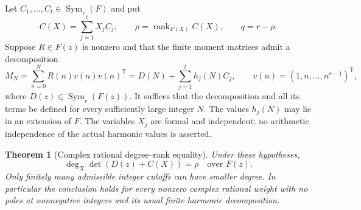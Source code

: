 \documentclass[11pt,a4paper]{article}
\newtheorem{theorem}{Theorem}[section]
\theoremstyle{definition}
\theoremstyle{remark}
\numberwithin{equation}{section}
\begin{document}
Let $C_1,\ldots,C_t\in\operatorname{Sym}_r(F)$ and put
\[
 C(X)=\sum_{j=1}^tX_jC_j,\qquad
 \rho=\operatorname{rank}_{F(X)}C(X),\qquad q=r-\rho.
\]
Suppose $R\in F(z)$ is nonzero and that the finite moment matrices
admit a decomposition
\begin{equation}\label{cr:decomposition}
 M_N=\sum_{n=0}^N R(n)v(n)v(n)^{\mathsf T}
     =D(N)+\sum_{j=1}^t h_j(N)C_j,
 \qquad v(n)=(1,n,\ldots,n^{r-1})^{\mathsf T},
\end{equation}
where $D(z)\in\operatorname{Sym}_r(F(z))$.  It suffices that the
decomposition and all its terms be defined for every sufficiently
large integer $N$.  The values $h_j(N)$ may lie in an extension of
$F$.  The variables $X_j$ are formal and independent; no arithmetic
independence of the actual harmonic values is asserted.

\begin{theorem}[Complex rational degree--rank equality]
\label{cr:degree}
Under these hypotheses,
\begin{equation}\label{cr:main}
 \boxed{\deg_X\det(D(z)+C(X))=\rho\quad\text{over }F(z).}
\end{equation}
Only finitely many admissible integer cutoffs can have smaller
degree.  In particular the conclusion holds for every nonzero complex
rational weight with no poles at nonnegative integers and its usual
finite harmonic decomposition.
\end{theorem}
\end{document}

